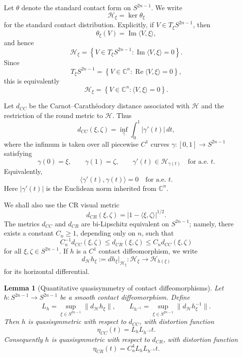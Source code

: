 \documentclass[11pt]{article}
\newtheorem{lemma}[theorem]{Lemma}
\theoremstyle{definition}
\theoremstyle{remark}
\theoremstyle{definition}
\newcommand{\C}{\mathbb C}
\begin{document}
Let \(\theta\) denote the standard contact form on \(S^{2n-1}\).  We write
\[
        \mathcal H_\xi=\ker\theta_\xi
\]
for the standard contact distribution.  Explicitly, if
\(V\in T_\xi S^{2n-1}\), then
\[
        \theta_\xi(V)=\operatorname{Im}\langle V,\xi\rangle,
\]
and hence
\[
        \mathcal H_\xi
        =
        \left\{
        V\in T_\xi S^{2n-1}:
        \operatorname{Im}\langle V,\xi\rangle=0
        \right\}.
\]
Since
\[
        T_\xi S^{2n-1}
        =
        \left\{
        V\in\C^n:
        \operatorname{Re}\langle V,\xi\rangle=0
        \right\},
\]
this is equivalently
\[
        \mathcal H_\xi
        =
        \left\{
        V\in\C^n:
        \langle V,\xi\rangle=0
        \right\}.
\]

Let \(d_{CC}\) be the Carnot--Carath\'eodory distance associated with
\(\mathcal H\) and the restriction of the round metric to \(\mathcal H\).
Thus
\[
        d_{CC}(\xi,\zeta)
        =
        \inf_\gamma
        \int_0^1 |\gamma'(t)|\,dt,
\]
where the infimum is taken over all piecewise \(C^1\) curves
\(\gamma:[0,1]\to S^{2n-1}\) satisfying
\[
        \gamma(0)=\xi,\qquad \gamma(1)=\zeta,
        \qquad
        \gamma'(t)\in\mathcal H_{\gamma(t)}
        \quad\text{for a.e. }t.
\]
Equivalently,
\[
        \langle \gamma'(t),\gamma(t)\rangle=0
        \quad\text{for a.e. }t.
\]
Here \(|\gamma'(t)|\) is the Euclidean norm inherited from \(\C^n\).

We shall also use the CR visual metric
\[
        d_{CR}(\xi,\zeta)
        =
        |1-\langle \xi,\zeta\rangle|^{1/2}.
\]
The metrics \(d_{CC}\) and \(d_{CR}\) are bi-Lipschitz equivalent on
\(S^{2n-1}\); namely, there exists a constant \(C_n\ge1\), depending only on
\(n\), such that
\[
        C_n^{-1}d_{CC}(\xi,\zeta)
        \le
        d_{CR}(\xi,\zeta)
        \le
        C_n d_{CC}(\xi,\zeta)
\]
for all \(\xi,\zeta\in S^{2n-1}\).  If \(h\) is a \(C^1\) contact
diffeomorphism, we write
\[
        d_{\mathcal H}h_\xi
        :=
        dh_\xi|_{\mathcal H_\xi}:
        \mathcal H_\xi\to\mathcal H_{h(\xi)}
\]
for its horizontal differential.

\begin{lemma}[Quantitative quasisymmetry of contact diffeomorphisms]
\label{lemma-quantitative-qs-contact}
Let \(h:S^{2n-1}\to S^{2n-1}\) be a smooth contact diffeomorphism.  Define
\[
        L_h
        =
        \sup_{\xi\in S^{2n-1}}
        \|d_{\mathcal H}h_\xi\|,
        \qquad
        L_{h^{-1}}
        =
        \sup_{\xi\in S^{2n-1}}
        \|d_{\mathcal H}h^{-1}_\xi\|.
\]
Then \(h\) is quasisymmetric with respect to \(d_{CC}\), with distortion
function
\[
        \eta_{CC}(t)=L_hL_{h^{-1}}t.
\]
Consequently \(h\) is quasisymmetric with respect to \(d_{CR}\), with distortion
function
\[
        \eta_{CR}(t)=C_n^4L_hL_{h^{-1}}t.
\]
\end{lemma}
\end{document}
